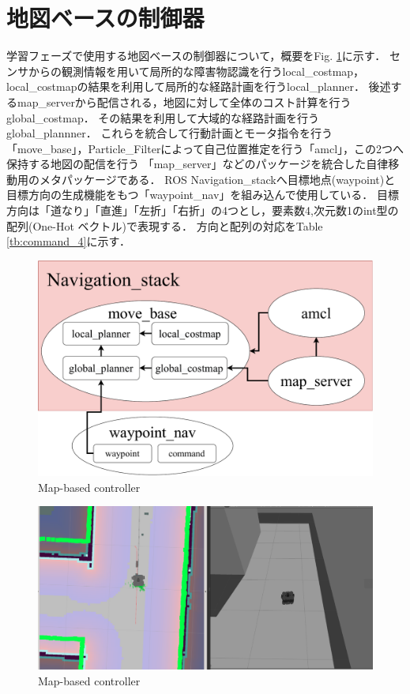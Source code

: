 \section{地図ベースの制御器}
    \label{seigyo}
    学習フェーズで使用する地図ベースの制御器について，概要をFig. \ref{fig::navigation}に示す．
    センサからの観測情報を用いて局所的な障害物認識を行うlocal\_costmap，local\_costmapの結果を利用して局所的な経路計画を行うlocal\_planner．
    後述するmap\_serverから配信される，地図に対して全体のコスト計算を行うglobal\_costmap．
    その結果を利用して大域的な経路計画を行うglobal\_plannner．
    これらを統合して行動計画とモータ指令を行う「move\_base」，Particle\_Filterによって自己位置推定を行う「amcl」，この2つへ保持する地図の配信を行う
    「map\_server」などのパッケージを統合した自律移動用のメタパッケージである．
    ROS Navigation\_stack\cite{navigation:online}へ目標地点(waypoint)と目標方向の生成機能をもつ「waypoint\_nav」を組み込んで使用している．
    目標方向は「道なり」「直進」「左折」「右折」の4つとし，要素数4,次元数1のint型の配列(One-Hot ベクトル)で表現する．
    方向と配列の対応をTable \ref{tb:command_4}に示す．
    \vspace{2.0zh}
    \begin{figure}[h]
        \centering
        \includegraphics[width = 12cm]{./figs/navigation.pdf}
        \caption{Map-based controller}
        \label{fig::navigation}
    \end{figure}

    \begin{figure}[h]
        \centering
        \includegraphics[width = 12cm]{./figs/mapbased.png}
        \caption{Map-based controller}
        \label{fig::mapbase}
    \end{figure}
    
